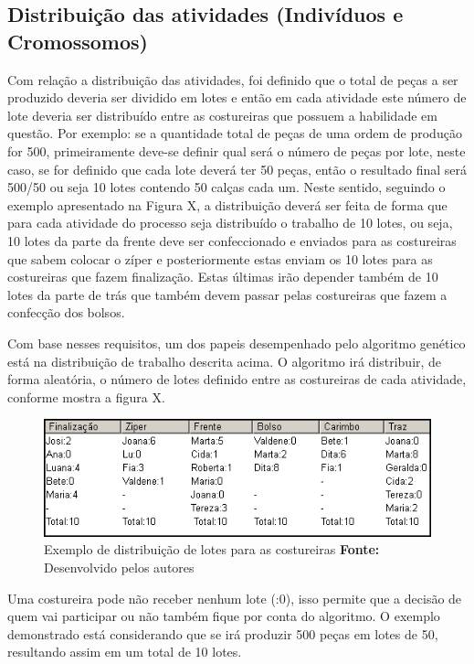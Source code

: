 \subsection{Distribuição das atividades (Indivíduos e Cromossomos)}
\par Com relação a distribuição das atividades, foi definido que o total de peças a ser produzido deveria ser
dividido em lotes e então em cada atividade este número de lote deveria ser distribuído entre as costureiras que
possuem a habilidade em questão. Por exemplo: se a quantidade total de peças de uma ordem de produção for 500,
primeiramente deve-se definir qual será o número de peças por lote, neste caso, se for definido que cada lote  
deverá ter 50 peças, então o resultado final será 500/50 ou seja 10 lotes contendo 50 calças cada um. Neste sentido, seguindo
o exemplo apresentado  na Figura X, a distribuição deverá ser feita de forma que para cada atividade do processo seja distribuído
o trabalho de 10 lotes, ou seja, 10 lotes da parte da frente deve ser confeccionado e enviados para as costureiras que sabem colocar
o zíper e posteriormente estas enviam os 10 lotes para as costureiras que fazem finalização. Estas últimas irão depender
também de 10 lotes da parte de trás que também devem passar pelas costureiras que fazem a confecção dos bolsos. 


\par Com base nesses requisitos, um dos papeis desempenhado pelo algoritmo genético está na distribuição de
trabalho descrita acima. O algoritmo irá distribuir, de forma aleatória, o número de lotes definido entre as costureiras
de cada atividade, conforme mostra a figura X. 

\begin{figure}[h!]
	\centerline{\includegraphics[scale=1.0]{./imagens/distribuicao_exemplo.png}}
	\caption[Distribuição de trabalho]
	{Exemplo de distribuição de lotes para as costureiras \textbf{Fonte:} Desenvolvido pelos autores}
	\label{fig:exemplo1}
\end{figure}

\par Uma costureira pode não receber nenhum lote (:0), isso permite que a decisão de quem vai participar ou não também 
fique por conta do algoritmo. O exemplo demonstrado está considerando que se irá produzir 500 peças em lotes de 50, 
resultando assim em um total de 10 lotes.

